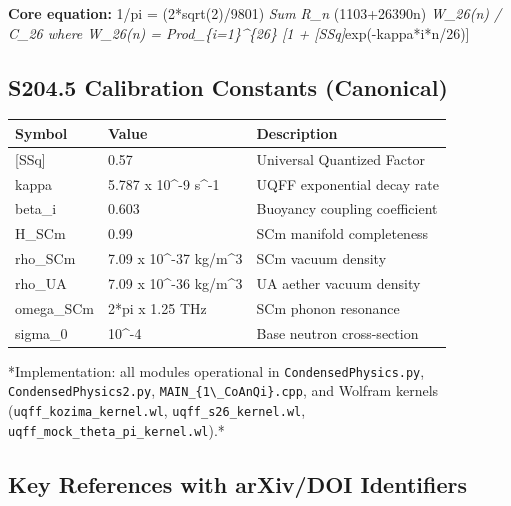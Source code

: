 \documentclass[11pt]{article}
\begin{document}
\textbf{Core equation:} 1/pi = (2*sqrt(2)/9801) \emph{ Sum R\_n } (1103+26390n) \emph{ W\_26(n) / C\_26 where W\_26(n) = Prod\_\{i=1\}\textasciicircum{}\{26\} [1 + [SSq]}exp(-kappa*i*n/26)]

\subsection*{S204.5 Calibration Constants (Canonical)}

\begin{center}
\begin{longtable}{lll}
\toprule
Symbol & Value & Description \tabularnewline
\midrule
\endhead
{}[SSq] & 0.57 & Universal Quantized Factor \tabularnewline
kappa & 5.787 x 10\textasciicircum{}-9 s\textasciicircum{}-1 & UQFF exponential decay rate \tabularnewline
beta\_i & 0.603 & Buoyancy coupling coefficient \tabularnewline
H\_SCm & 0.99 & SCm manifold completeness \tabularnewline
rho\_SCm & 7.09 x 10\textasciicircum{}-37 kg/m\textasciicircum{}3 & SCm vacuum density \tabularnewline
rho\_UA & 7.09 x 10\textasciicircum{}-36 kg/m\textasciicircum{}3 & UA aether vacuum density \tabularnewline
omega\_SCm & 2*pi x 1.25 THz & SCm phonon resonance \tabularnewline
sigma\_0 & 10\textasciicircum{}-4 & Base neutron cross-section \tabularnewline
\bottomrule
\end{longtable}
\end{center}

*Implementation: all modules operational in \verb|CondensedPhysics.py|, \verb|CondensedPhysics2.py|, \verb|MAIN_{1\_CoAnQi}.cpp|, and Wolfram kernels (\verb|uqff_kozima_kernel.wl|, \verb|uqff_s26_kernel.wl|, \verb|uqff_mock_theta_pi_kernel.wl|).*

\subsection*{Key References with arXiv/DOI Identifiers}
\end{document}
